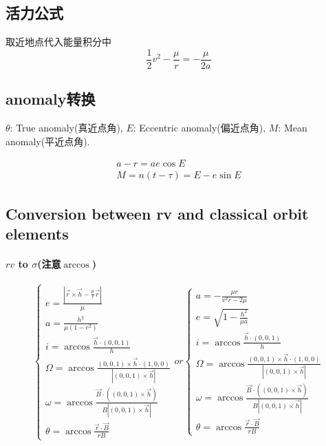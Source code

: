 \documentclass[UTF8]{ctexart}
\begin{document}
\subsection{活力公式}
取近地点代入能量积分中
\begin{equation}
	\frac{1}{2}v^2-\frac{\mu}{r}=-\frac{\mu}{2a}
\end{equation}

\subsection{anomaly转换}

$\theta$: True anomaly(真近点角), $E$: Eccentric anomaly(偏近点角), $M$: Mean anomaly(平近点角).

\begin{gather}
	a-r=ae\cos E\\
	M=n(t-\tau)=E-e\sin E
\end{gather}

\subsection{Conversion between rv and classical orbit elements}
\paragraph{$rv$ to $\sigma$(注意$\arccos$)}
\begin{equation}
	\begin{cases}
		e=\frac{|\dot{\vec{r}}\times\vec{h}-\frac{\mu}{r}\vec{r}|}{\mu}\\
		a=\frac{h^2}{\mu(1-e^2)}\\
		i=\arccos{\frac{\vec{h}\cdot(0,0,1)}{h}}\\
		\Omega=\arccos\frac{(0,0,1)\times\vec{h}\cdot(1,0,0)}{|(0,0,1)\times\vec{h}|}\\
		\omega=\arccos\frac{\vec{B}\cdot((0,0,1)\times\vec{h})}{B|(0,0,1)\times\vec{h}|}\\
		\theta=\arccos\frac{\vec{r}\cdot\vec{B}}{rB}
	\end{cases}or
\begin{cases}
	a=-\frac{\mu r}{v^2r-2\mu}\\
	e=\sqrt{1-\frac{h^2}{\mu a}}\\
	i=\arccos{\frac{\vec{h}\cdot(0,0,1)}{h}}\\
	\Omega=\arccos\frac{(0,0,1)\times\vec{h}\cdot(1,0,0)}{|(0,0,1)\times\vec{h}|}\\
	\omega=\arccos\frac{\vec{B}\cdot((0,0,1)\times\vec{h})}{B|(0,0,1)\times\vec{h}|}\\
	\theta=\arccos\frac{\vec{r}\cdot\vec{B}}{rB}
\end{cases}
\end{equation}
\end{document}
